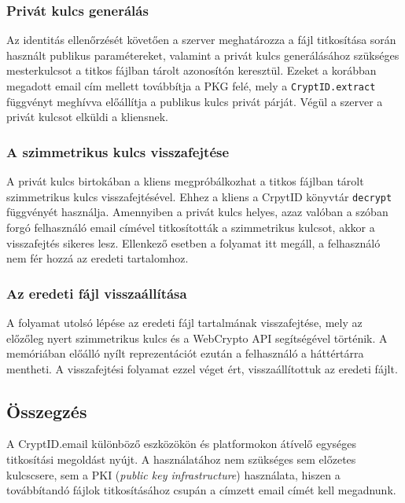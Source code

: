 \subsubsection{Privát kulcs generálás}

Az identitás ellenőrzését követően a szerver meghatározza a fájl titkosítása során használt publikus paramétereket, valamint a privát kulcs generálásához szükséges mesterkulcsot a titkos fájlban tárolt azonosítón keresztül.  Ezeket a korábban megadott email cím mellett továbbítja a PKG felé, mely a \texttt{CryptID.extract} függvényt meghívva előállítja a publikus kulcs privát párját. Végül a szerver a privát kulcsot elküldi a kliensnek.

\subsubsection{A szimmetrikus kulcs visszafejtése}

A privát kulcs birtokában a kliens megpróbálkozhat a titkos fájlban tárolt szimmetrikus kulcs visszafejtésével. Ehhez a kliens a CrpytID könyvtár \texttt{decrypt} függvényét használja. Amennyiben a privát kulcs helyes, azaz valóban a szóban forgó felhasználó email címével titkosították a szimmetrikus kulcsot, akkor a visszafejtés sikeres lesz. Ellenkező esetben a folyamat itt megáll, a felhasználó nem fér hozzá az eredeti tartalomhoz.

\subsubsection{Az eredeti fájl visszaállítása}

A folyamat utolsó lépése az eredeti fájl tartalmának visszafejtése, mely az előzőleg nyert szimmetrikus kulcs és a WebCrypto API segítségével történik. A memóriában előálló nyílt reprezentációt ezután a felhasználó a háttértárra mentheti. A visszafejtési folyamat ezzel véget ért, visszaállítottuk az eredeti fájlt.

\subsection{Összegzés}

A CryptID.email különböző eszközökön és platformokon átívelő egységes titkosítási megoldást nyújt. A használatához nem szükséges sem előzetes kulcscsere, sem a PKI (\textit{public key infrastructure}) használata, hiszen a továbbítandó fájlok titkosításához csupán a címzett email címét kell megadnunk.


